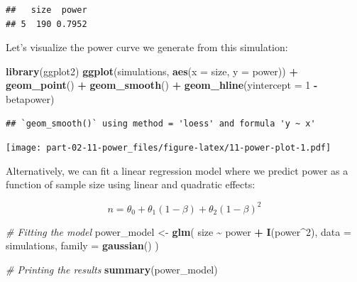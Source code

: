 \documentclass[
]{book}
\newenvironment{Shaded}{\begin{snugshade}}{\end{snugshade}}
\newcommand{\AttributeTok}[1]{\textcolor[rgb]{0.13,0.29,0.53}{#1}}
\newcommand{\CommentTok}[1]{\textcolor[rgb]{0.56,0.35,0.01}{\textit{#1}}}
\newcommand{\ConstantTok}[1]{\textcolor[rgb]{0.56,0.35,0.01}{#1}}
\newcommand{\DecValTok}[1]{\textcolor[rgb]{0.00,0.00,0.81}{#1}}
\newcommand{\FunctionTok}[1]{\textcolor[rgb]{0.13,0.29,0.53}{\textbf{#1}}}
\newcommand{\NormalTok}[1]{#1}
\newcommand{\OtherTok}[1]{\textcolor[rgb]{0.56,0.35,0.01}{#1}}
\newcommand{\SpecialCharTok}[1]{\textcolor[rgb]{0.81,0.36,0.00}{\textbf{#1}}}
\begin{document}
\begin{Shaded}
\end{Shaded}

\begin{verbatim}
##   size  power
## 5  190 0.7952
\end{verbatim}

Let's visualize the power curve we generate from this simulation:

\begin{Shaded}
\begin{Highlighting}[]
\FunctionTok{library}\NormalTok{(ggplot2)}
\FunctionTok{ggplot}\NormalTok{(simulations, }\FunctionTok{aes}\NormalTok{(}\AttributeTok{x =}\NormalTok{ size, }\AttributeTok{y =}\NormalTok{ power)) }\SpecialCharTok{+}
    \FunctionTok{geom\_point}\NormalTok{() }\SpecialCharTok{+}
    \FunctionTok{geom\_smooth}\NormalTok{() }\SpecialCharTok{+}
    \FunctionTok{geom\_hline}\NormalTok{(}\AttributeTok{yintercept =} \DecValTok{1} \SpecialCharTok{{-}}\NormalTok{ betapower)}
\end{Highlighting}
\end{Shaded}

\begin{verbatim}
## `geom_smooth()` using method = 'loess' and formula 'y ~ x'
\end{verbatim}

\texttt{[image: part-02-11-power\_files/figure-latex/11-power-plot-1.pdf]}

Alternatively, we can fit a linear regression model where we predict power as a function of sample size using linear and quadratic effects:

\[
n = \theta_0 + \theta_1 (1 - \beta) + \theta_2 (1 - \beta)^2
\]

\begin{Shaded}
\begin{Highlighting}[]
\CommentTok{\# Fitting the model}
\NormalTok{power\_model }\OtherTok{\textless{}{-}} \FunctionTok{glm}\NormalTok{(}
\NormalTok{  size }\SpecialCharTok{\textasciitilde{}}\NormalTok{ power }\SpecialCharTok{+} \FunctionTok{I}\NormalTok{(power}\SpecialCharTok{\^{}}\DecValTok{2}\NormalTok{),}
  \AttributeTok{data =}\NormalTok{ simulations, }\AttributeTok{family =} \FunctionTok{gaussian}\NormalTok{()}
\NormalTok{)}

\CommentTok{\# Printing the results}
\FunctionTok{summary}\NormalTok{(power\_model)}
\end{Highlighting}
\end{Shaded}
\end{document}
